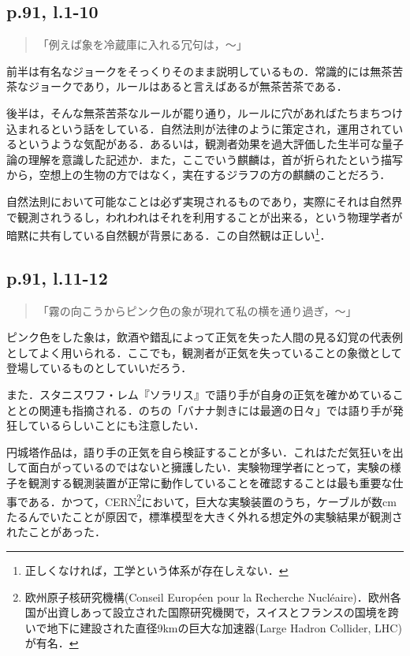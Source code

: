 \documentclass[10pt, a5paper, twoside]{ltjsarticle}
\begin{document}
        \subsection{p.91, l.1-10}

            \begin{quote}
                「例えば象を冷蔵庫に入れる冗句は，〜」
            \end{quote}

            前半は有名なジョークをそっくりそのまま説明しているもの．常識的には無茶苦茶なジョークであり，ルールはあると言えばあるが無茶苦茶である．

            後半は，そんな無茶苦茶なルールが罷り通り，ルールに穴があればたちまちつけ込まれるという話をしている．自然法則が法律のように策定され，運用されているというような気配がある．あるいは，観測者効果を過大評価した生半可な量子論の理解を意識した記述か．また，ここでいう麒麟は，首が折られたという描写から，空想上の生物の方ではなく，実在するジラフの方の麒麟のことだろう．

            自然法則において可能なことは必ず実現されるものであり，実際にそれは自然界で観測されうるし，われわれはそれを利用することが出来る，という物理学者が暗黙に共有している自然観が背景にある．この自然観は正しい\footnote{正しくなければ，工学という体系が存在しえない．}．

        \subsection{p.91, l.11-12}

            \begin{quote}
                「霧の向こうからピンク色の象が現れて私の横を通り過ぎ，〜」
            \end{quote}

                ピンク色をした象は，飲酒や錯乱によって正気を失った人間の見る幻覚の代表例としてよく用いられる．ここでも，観測者が正気を失っていることの象徴として登場しているものとしていいだろう．

                また．スタニスワフ・レム『ソラリス』で語り手が自身の正気を確かめていることとの関連も指摘される．のちの「バナナ剝きには最適の日々」では語り手が発狂しているらしいことにも注意したい．

                円城塔作品は，語り手の正気を自ら検証することが多い．これはただ気狂いを出して面白がっているのではないと擁護したい．実験物理学者にとって，実験の様子を観測する観測装置が正常に動作していることを確認することは最も重要な仕事である．かつて，CERN\footnote{欧州原子核研究機構(Conseil Européen pour la Recherche Nucléaire)．欧州各国が出資しあって設立された国際研究機関で，スイスとフランスの国境を跨いで地下に建設された直径9kmの巨大な加速器(Large Hadron Collider, LHC)が有名．}において，巨大な実験装置のうち，ケーブルが数cmたるんでいたことが原因で，標準模型を大きく外れる想定外の実験結果が観測されたことがあった．
\end{document}
